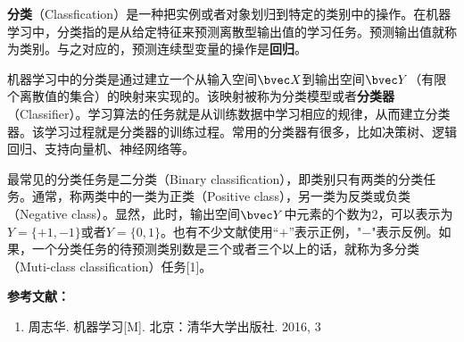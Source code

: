 

\textbf{分类}（Classfication）是一种把实例或者对象划归到特定的类别中的操作。在机器学习中，分类指的是从给定特征来预测离散型输出值的学习任务。预测输出值就称为类别。与之对应的，预测连续型变量的操作是\textbf{回归}。

机器学习中的分类是通过建立一个从输入空间$\bvec X$到输出空间$\bvec Y$（有限个离散值的集合）的映射来实现的。该映射被称为分类模型或者\textbf{分类器}（Classifier）。学习算法的任务就是从训练数据中学习相应的规律，从而建立分类器。该学习过程就是分类器的训练过程。常用的分类器有很多，比如决策树、逻辑回归、支持向量机、神经网络等。

最常见的分类任务是二分类（Binary classification），即类别只有两类的分类任务。通常，称两类中的一类为正类（Positive class），另一类为反类或负类（Negative class）。显然，此时，输出空间$\bvec Y$中元素的个数为$2$，可以表示为$Y=\{+1, -1\}$或者$Y=\{0, 1\}$。也有不少文献使用“$+$”表示正例，"$-$"表示反例。如果，一个分类任务的待预测类别数是三个或者三个以上的话，就称为多分类（Muti-class classification）任务[1]。




\textbf{参考文献：}
\begin{enumerate}
\item 周志华. 机器学习[M]. 北京：清华大学出版社. 2016, 3
\end{enumerate}